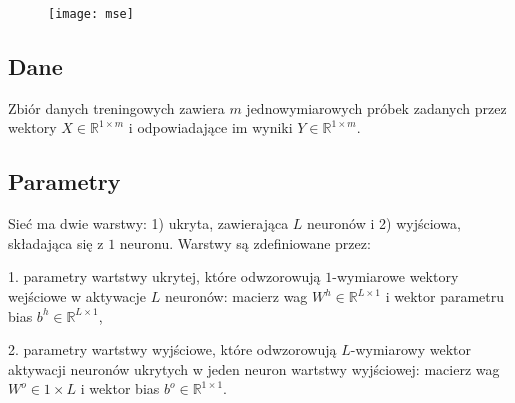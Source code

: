 \documentclass[]{article}
\theoremstyle{definition}
\begin{document}
\begin{figure}[h!]
	\centering
	\texttt{[image: mse]}

\end{figure}







\newpage
\subsection{Dane}

Zbiór danych treningowych zawiera $m$ jednowymiarowych próbek zadanych przez wektory $X \in \mathbb{R}^{1\times m}$ i odpowiadające im wyniki $Y\in \mathbb{R}^{1\times m}$.



\subsection{Parametry}

Sieć ma dwie warstwy: 1) ukryta, zawierająca $L$ neuronów i 2) wyjściowa, składająca się z $1$ neuronu. Warstwy są zdefiniowane przez:

1. parametry wartstwy ukrytej, które odwzorowują $1$-wymiarowe wektory wejściowe w aktywacje $L$ neuronów:
macierz wag $W^h\in\mathbb{R}^{L\times 1	}$ i wektor parametru bias $b^h\in\mathbb{R}^{L\times 1}$,

2. parametry wartstwy wyjściowe, które odwzorowują $L$-wymiarowy wektor aktywacji neuronów ukrytych w jeden neuron wartstwy wyjściowej:
macierz wag $W^o\in{1\times L}$ i wektor bias $b^o\in\mathbb{R}^{1\times 1}$.
\end{document}
